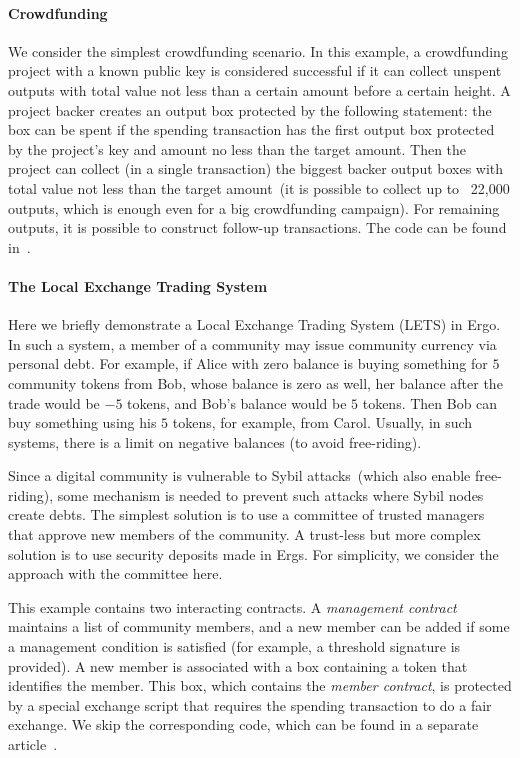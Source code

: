 \paragraph{Crowdfunding}

 We consider the simplest crowdfunding scenario. In this example, a crowdfunding project with a known public key is considered successful if it can collect unspent outputs with total value not less than a certain amount before a certain height. A project backer creates an output box protected by the following statement: the box can be spent 
 if the spending transaction has the first output box protected by the project's key and amount no less than the target amount.
 Then the project can collect (in a single transaction) the biggest backer output boxes with total value not less than the target amount~(it is possible to collect up to ~22,000 outputs, which is
 enough even for a big crowdfunding campaign). For remaining outputs, it is possible to construct follow-up transactions. The code can be found in~\cite{ergoTutorial}.

\paragraph{The Local Exchange Trading System}

 Here we briefly demonstrate a Local Exchange Trading System (LETS) in Ergo. In such a system, a member of a community may issue community currency via personal debt. For example, if Alice with zero balance is buying something for $5$
 community tokens from Bob, whose balance is zero as well, her balance after the trade would be $-5$ tokens, and
 Bob's balance would be $5$ tokens. Then Bob can buy something using his $5$ tokens, for example, from Carol.
 Usually, in such systems, there is a limit on negative balances (to avoid free-riding).

 Since a digital community is vulnerable to Sybil attacks~(which also enable free-riding), some mechanism is needed to prevent such attacks where Sybil nodes create debts. 
 The simplest solution is to use a committee of trusted managers that approve new members of the community. A trust-less but more complex solution is to use security deposits made in Ergs. For simplicity, we consider the approach with the committee here.
 

 This example contains two interacting contracts. A {\em management contract} maintains a list of community members, and a new member can be added if some a management condition is satisfied  (for example, a threshold
 signature is provided). A new member is associated with a box containing a token that identifies the member. This box, which contains the {\em member contract}, is protected by a special exchange script that requires the spending transaction to do a fair exchange.
 We skip the corresponding code, which can be found in a separate article~\cite{letsTutorial}.
 
